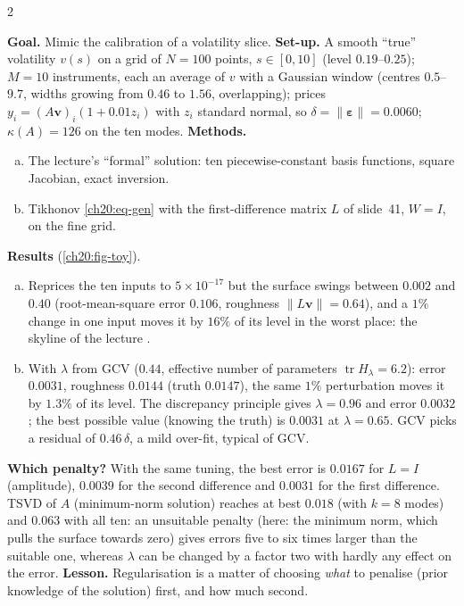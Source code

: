 \begin{paracol}{2}
\begin{casestudy}\label{ch20:cs-toy}
\textbf{Goal.} Mimic the calibration of a volatility slice. \textbf{Set-up.} A smooth ``true'' volatility $v(s)$ on a grid of $N=100$ points, $s\in[0,10]$ (level $0.19$--$0.25$); $M=10$ instruments, each an average of $v$ with a Gaussian window (centres $0.5$--$9.7$, widths growing from $0.46$ to $1.56$, overlapping); prices $y_i=(A\bm v)_i(1+0.01z_i)$ with $z_i$ standard normal, so $\delta=\|\bm\varepsilon\|=0.0060$;
$\kappa(A)=126$ on the ten modes.
\textbf{Methods.}
\begin{enumerate}[(a)]
  \item The lecture's ``formal'' solution: ten piecewise-constant basis functions, square Jacobian, exact inversion.
  \item Tikhonov \eqref{ch20:eq-gen} with the first-difference matrix $L$ of slide~41, $W=I$, on the fine grid.
\end{enumerate}
\textbf{Results} (\cref{ch20:fig-toy}).
\begin{enumerate}[(a)]
  \item Reprices the ten inputs to $5\times10^{-17}$ but the surface swings between $0.002$ and $0.40$ (root-mean-square error $0.106$, roughness $\|L\bm v\|=0.64$), and a $1\%$ change in one input moves it by $16\%$ of its level in the worst place: the skyline of the
      lecture .
  \item With $\lambda$ from GCV ($0.44$, effective number of parameters $\operatorname{tr}H_\lambda=6.2$): error $0.0031$, roughness $0.0144$ (truth $0.0147$), the same $1\%$ perturbation moves it by $1.3\%$ of its level. The discrepancy principle
      gives $\lambda=0.96$ and error $0.0032$; the best possible value (knowing the truth) is $0.0031$ at $\lambda=0.65$. GCV picks a residual of $0.46\,\delta$, a mild over-fit, typical of GCV.
\end{enumerate}
\textbf{Which penalty?} With the same tuning, the best error is $0.0167$ for $L=I$ (amplitude), $0.0039$ for the second difference and $0.0031$ for the first difference. TSVD of $A$ (minimum-norm solution) reaches at best $0.018$ (with $k=8$ modes) and
$0.063$ with all ten: an unsuitable penalty (here: the minimum norm, which pulls the surface towards zero) gives errors five to six times larger than the suitable one, whereas $\lambda$ can be changed by a factor two with hardly any effect on the error.
\textbf{Lesson.} Regularisation is a matter of choosing \emph{what} to penalise (prior knowledge of the solution) first, and how much second.
\end{casestudy}


\end{paracol}

